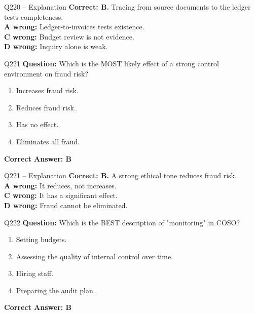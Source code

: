 \documentclass[aspectratio=169,10pt]{beamer}
\begin{document}
	\begin{frame}[t]{Q220 -- Explanation}
		\small
		\textbf{Correct: B.} Tracing from source documents to the ledger tests completeness. \\[4pt]
		\textbf{A wrong:} Ledger-to-invoices tests existence. \\[2pt]
		\textbf{C wrong:} Budget review is not evidence. \\[2pt]
		\textbf{D wrong:} Inquiry alone is weak.
	\end{frame}
	
	\begin{frame}[t]{Q221}
		\small
		\textbf{Question:} Which is the MOST likely effect of a strong control environment on fraud risk?
		\begin{enumerate}[label=\Alph*.,itemsep=1pt,topsep=2pt]
			\item Increases fraud risk.
			\item Reduces fraud risk.
			\item Has no effect.
			\item Eliminates all fraud.
		\end{enumerate}
		\vspace{4pt}
		\textbf{Correct Answer: B}
	\end{frame}
	
	\begin{frame}[t]{Q221 -- Explanation}
		\small
		\textbf{Correct: B.} A strong ethical tone reduces fraud risk. \\[4pt]
		\textbf{A wrong:} It reduces, not increases. \\[2pt]
		\textbf{C wrong:} It has a significant effect. \\[2pt]
		\textbf{D wrong:} Fraud cannot be eliminated.
	\end{frame}
	
	\begin{frame}[t]{Q222}
		\small
		\textbf{Question:} Which is the BEST description of "monitoring" in COSO?
		\begin{enumerate}[label=\Alph*.,itemsep=1pt,topsep=2pt]
			\item Setting budgets.
			\item Assessing the quality of internal control over time.
			\item Hiring staff.
			\item Preparing the audit plan.
		\end{enumerate}
		\vspace{4pt}
		\textbf{Correct Answer: B}
	\end{frame}
	
\end{document}
